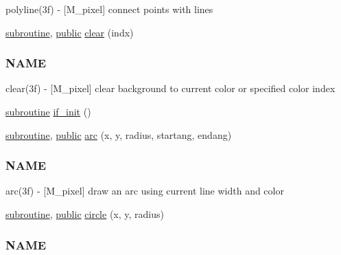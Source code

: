 \begin{DoxyCompactItemize}
\begin{DoxyCompactList}
polyline(3f) -\/ \mbox{[}M\+\_\+pixel\mbox{]} connect points with lines \end{DoxyCompactList}\item 
\hyperlink{M__stopwatch_83_8txt_acfbcff50169d691ff02d4a123ed70482}{subroutine}, \hyperlink{M__stopwatch_83_8txt_a2f74811300c361e53b430611a7d1769f}{public} \hyperlink{namespacem__pixel_af3b81a21a0b2f6b5eddd09c031bd6173}{clear} (indx)
\begin{DoxyCompactList}\small\item\em \subsubsection*{N\+A\+ME}

clear(3f) -\/ \mbox{[}M\+\_\+pixel\mbox{]} clear background to current color or specified color index \end{DoxyCompactList}\item 
\hyperlink{M__stopwatch_83_8txt_acfbcff50169d691ff02d4a123ed70482}{subroutine} \hyperlink{namespacem__pixel_a6c23c2779e54da4ac7505cfb816cc2b1}{if\+\_\+init} ()
\item 
\hyperlink{M__stopwatch_83_8txt_acfbcff50169d691ff02d4a123ed70482}{subroutine}, \hyperlink{M__stopwatch_83_8txt_a2f74811300c361e53b430611a7d1769f}{public} \hyperlink{namespacem__pixel_ab881b9c2adff081a086cd83a1f1341fb}{arc} (x, y, radius, startang, endang)
\begin{DoxyCompactList}\small\item\em \subsubsection*{N\+A\+ME}

arc(3f) -\/ \mbox{[}M\+\_\+pixel\mbox{]} draw an arc using current line width and color \end{DoxyCompactList}\item 
\hyperlink{M__stopwatch_83_8txt_acfbcff50169d691ff02d4a123ed70482}{subroutine}, \hyperlink{M__stopwatch_83_8txt_a2f74811300c361e53b430611a7d1769f}{public} \hyperlink{namespacem__pixel_ab3b12cc498ed490014aa5fcc0bb278d2}{circle} (x, y, radius)
\begin{DoxyCompactList}\small\item\em \subsubsection*{N\+A\+ME}


\end{DoxyCompactList}
\end{DoxyCompactItemize}
